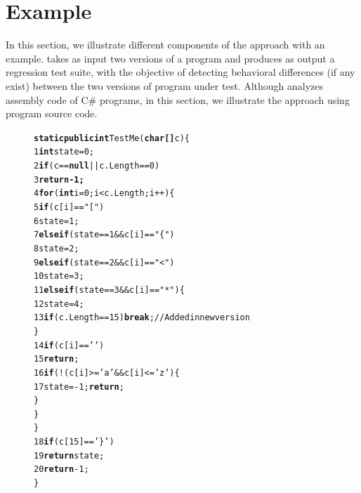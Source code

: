 \section{Example}
\label{sec:example}
In this section, we illustrate different components of the  approach with an example.  takes as input two versions of a program and produces as output a regression test suite, with the objective of detecting behavioral differences (if any exist) between the two versions of program under test. Although  analyzes assembly code of C\# programs, in this section, we illustrate the  approach using program source code. 

\begin{figure}[t]
\begin{CodeOut}
\begin{alltt}

  \hspace{0.25cm}\textbf{static public int} TestMe(\textbf{char[] }c)\{
1 \hspace{0.5cm} \textbf{int} state = 0;
2 \hspace{0.5cm} \textbf{if}(c == \textbf{null} || c.Length == 0) 
3 \hspace{0.75cm} \textbf{return -1;}   
4 \hspace{0.5cm} \textbf{for}(\textbf{int} i=0; i< c.Length; i++)\{
5 \hspace{1.0cm} \textbf{if}(c[i] == "[")
6 \hspace{1.25cm} state =1;
7 \hspace{1.0cm} \textbf{else if}(state == 1 && c[i] == "\{")
8 \hspace{1.25cm} state =2;
9 \hspace{1.0cm} \textbf{else if}(state == 2 &&  c[i] == "<") 
10\hspace{1.25cm} state =3;
11\hspace{1.0cm} \textbf{else if}(state == 3 && c[i] == "*")\{ 
12\hspace{1.25cm} state =4;
13\hspace{1.25cm} \textbf{if}(c.Length==15) \textbf{break};//Added in new version
	\hspace{1.0cm}   \}
14\hspace{1.0cm} \textbf{if}(c[i]==' ') 
15\hspace{1.25cm} \textbf{return};
16\hspace{1.0cm} \textbf{if}(!(c[i] >= 'a' && c[i] <= 'z')\{
17\hspace{1.25cm} state=-1; \textbf{return};
  \hspace{1.0cm} \}
  \hspace{.75cm} \}
  \hspace{.50cm} \}
18\hspace{.50cm} \textbf{if}(c[15] == '\}')
19\hspace{.70cm} \textbf{return} state;
20\hspace{.5cm} \textbf{return} -1;
  \hspace{0.25cm}\}
  

\end{alltt}
\end{CodeOut}
\end{figure}
